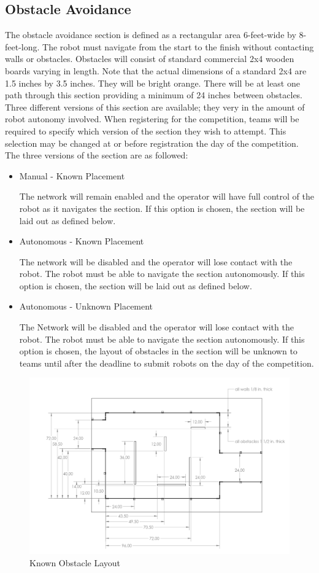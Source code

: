 \subsection{Obstacle Avoidance}
The obstacle avoidance section is defined as a rectangular area 6-feet-wide by 8-feet-long. The robot must navigate from the start to the finish without contacting walls or obstacles. Obstacles will consist of standard commercial 2x4 wooden boards varying in length. Note that the actual dimensions of a standard 2x4 are 1.5 inches by 3.5 inches. They will be bright orange. There will be at least one path through this section providing a minimum of 24 inches between obstacles. Three different versions of this section are available; they very in the amount of robot autonomy involved. When registering for the competition, teams will be required to specify which version of the section they wish to attempt. This selection may be changed at or before registration the day of the competition. The three versions of the section are as followed:

\begin{itemize}
    \item Manual - Known Placement
    
        The network will remain enabled and the operator will have full control of the robot as it navigates the section. If this option is chosen, the section will be laid out as defined below.
    \item Autonomous - Known Placement
    
        The network will be disabled and the operator will lose contact with the robot. The robot must be able to navigate the section autonomously. If this option is chosen, the section will be laid out as defined below.
    \item Autonomous - Unknown Placement
    
        The Network will be disabled and the operator will lose contact with the robot. The robot must be able to navigate the section autonomously. If this option is chosen, the layout of obstacles in the section will be unknown to teams until after the deadline to submit robots on the day of the competition. 
        
\end{itemize}

\begin{figure}[H]
	\centering
	\includegraphics[width=.85\textwidth]{images/avoidance_overview.png}
	\caption{Known Obstacle Layout}
	\label{fig:avoidance_overview} 
\end{figure}